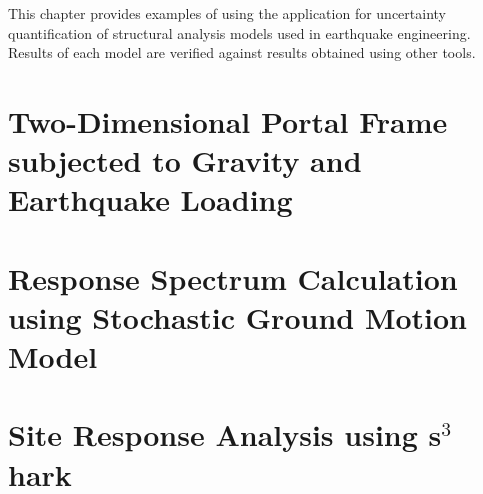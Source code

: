 This chapter provides examples of using the \texttt{\getsoftwarename{}} application for uncertainty
quantification of structural analysis models used in earthquake
engineering. Results of each model are verified against results
obtained using other tools. \cite{federal_emergency_management_agency_fema_hazus_2018-2} \cite{applied_technology_council_atc_fema_2012} \\

\section{Two-Dimensional Portal Frame subjected to Gravity and Earthquake Loading}


\section{Response Spectrum Calculation using Stochastic Ground Motion Model}


\section{Site Response Analysis using s$^3$hark}

